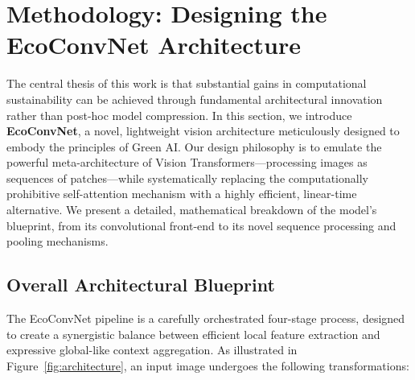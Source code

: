 \documentclass[12pt, a4paper]{article}
\begin{document}

\section{Methodology: Designing the EcoConvNet Architecture}
\label{sec:methodology}

The central thesis of this work is that substantial gains in computational sustainability can be achieved through fundamental architectural innovation rather than post-hoc model compression. In this section, we introduce \textbf{EcoConvNet}, a novel, lightweight vision architecture meticulously designed to embody the principles of Green AI. Our design philosophy is to emulate the powerful meta-architecture of Vision Transformers---processing images as sequences of patches---while systematically replacing the computationally prohibitive self-attention mechanism with a highly efficient, linear-time alternative. We present a detailed, mathematical breakdown of the model's blueprint, from its convolutional front-end to its novel sequence processing and pooling mechanisms.

\subsection{Overall Architectural Blueprint}
\label{ssec:blueprint}

The EcoConvNet pipeline is a carefully orchestrated four-stage process, designed to create a synergistic balance between efficient local feature extraction and expressive global-like context aggregation. As illustrated in Figure~\ref{fig:architecture}, an input image undergoes the following transformations:
\end{document}

